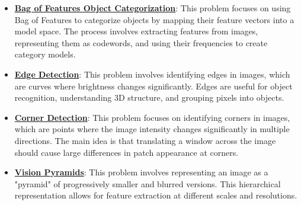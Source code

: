 \documentclass{article}%
\begin{document}
\begin{itemize}[leftmargin=*]%
\item \href{https://purdue.brightspace.com/d2l/common/assets/pdfjs-d2l-dist/1.0.14-legacy/web/viewer.html?file=%2Fcontent%2Fenforced%2F1095467-wl.202510.CS.24300.001%2F08L2-Feature Extraction.pdf%3Fou%3D1095467&lang=en-us&container=d2l-fileviewer-rendered-pdf&fullscreen=d2l-fileviewer-rendered-pdf-dialog&height=667#page=3}{\textbf{Bag of Features Object Categorization}}: This problem focuses on using Bag of Features to categorize objects by mapping their feature vectors into a model space. The process involves extracting features from images, representing them as codewords, and using their frequencies to create category models.%
\item \href{https://purdue.brightspace.com/d2l/common/assets/pdfjs-d2l-dist/1.0.14-legacy/web/viewer.html?file=%2Fcontent%2Fenforced%2F1095467-wl.202510.CS.24300.001%2F08L2-Feature Extraction.pdf%3Fou%3D1095467&lang=en-us&container=d2l-fileviewer-rendered-pdf&fullscreen=d2l-fileviewer-rendered-pdf-dialog&height=667#page=4}{\textbf{Edge Detection}}: This problem involves identifying edges in images, which are curves where brightness changes significantly. Edges are useful for object recognition, understanding 3D structure, and grouping pixels into objects.%
\item \href{https://purdue.brightspace.com/d2l/common/assets/pdfjs-d2l-dist/1.0.14-legacy/web/viewer.html?file=%2Fcontent%2Fenforced%2F1095467-wl.202510.CS.24300.001%2F08L2-Feature Extraction.pdf%3Fou%3D1095467&lang=en-us&container=d2l-fileviewer-rendered-pdf&fullscreen=d2l-fileviewer-rendered-pdf-dialog&height=667#page=20}{\textbf{Corner Detection}}: This problem focuses on identifying corners in images, which are points where the image intensity changes significantly in multiple directions. The main idea is that translating a window across the image should cause large differences in patch appearance at corners.%
\item \href{https://purdue.brightspace.com/d2l/common/assets/pdfjs-d2l-dist/1.0.14-legacy/web/viewer.html?file=%2Fcontent%2Fenforced%2F1095467-wl.202510.CS.24300.001%2F08L2-Feature Extraction.pdf%3Fou%3D1095467&lang=en-us&container=d2l-fileviewer-rendered-pdf&fullscreen=d2l-fileviewer-rendered-pdf-dialog&height=667#page=30}{\textbf{Vision Pyramids}}: This problem involves representing an image as a "pyramid" of progressively smaller and blurred versions. This hierarchical representation allows for feature extraction at different scales and resolutions.%
\end{itemize}%
\end{document}
